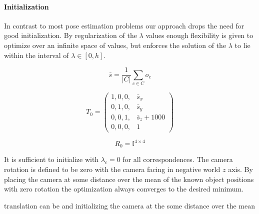 \paragraph{Initialization}
In contrast to most pose estimation problems our approach drops the need for good initialization. 
By regularization of the $\lambda$ values enough flexibility is given to optimize over an infinite space of values, 
but enforces the solution of the $\lambda$ to lie within the interval of $\lambda \in [0, h]$.

\begin{equation}
  \bar{s} = \frac{1}{\left\lvert C \right\rvert } \sum_{c \in C} o_c 
\end{equation}

\begin{equation}
  T_0 = \begin{pmatrix}
    1, 0, 0,& \bar{s}_x \\   
    0, 1, 0,& \bar{s}_y \\   
    0, 0, 1,& \bar{s}_z + 1000 \\   
    0, 0, 0,& 1   
  \end{pmatrix}
\end{equation}

\begin{equation}
  R_0 = \mathbb{I} ^ {4 \times 4}
\end{equation}

It is sufficient to initialize with $\lambda_c = 0$ for all correspondences.
The camera rotation is defined to be zero with the camera facing in negative world $z$ axis.
By placing the camera at some distance over the mean of the known object positions with zero rotation the optimization always converges to the desired minimum.

 translation can be  and initializing the camera at the some distance over the mean    
